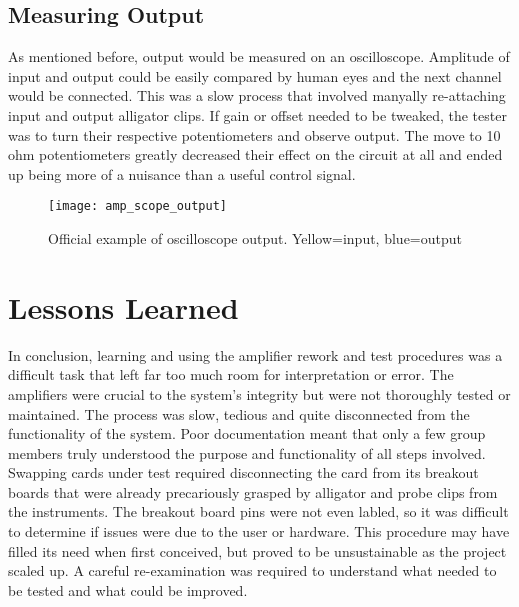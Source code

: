 \subsection{Measuring Output}
As mentioned before, output would be measured on an oscilloscope. Amplitude of input and output could be easily compared by human eyes and the next channel would be connected. This was a slow process that involved manyally re-attaching input and output alligator clips. If gain or offset needed to be tweaked, the tester was to turn their respective potentiometers and observe output. The move to 10 ohm potentiometers greatly decreased their effect on the circuit at all and ended up being more of a nuisance than a useful control signal.
\begin{figure}[!htb]
	\centering
	\texttt{[image: amp\_scope\_output]}
	\caption{Official example of oscilloscope output. Yellow=input, blue=output}
\end{figure}
\section{Lessons Learned}
In conclusion, learning and using the amplifier rework and test procedures was a difficult task that left far too much room for interpretation or error. The amplifiers were crucial to the system's integrity but were not thoroughly tested or maintained. The process was slow, tedious and quite disconnected from the functionality of the system. Poor documentation meant that only a few group members truly understood the purpose and functionality of all steps involved. Swapping cards under test required disconnecting the card from its breakout boards that were already precariously grasped by alligator and probe clips from the instruments. The breakout board pins were not even labled, so it was difficult to determine if issues were due to the user or hardware. This procedure may have filled its need when first conceived, but proved to be unsustainable as the project scaled up. A careful re-examination was required to understand what needed to be tested and what could be improved.

